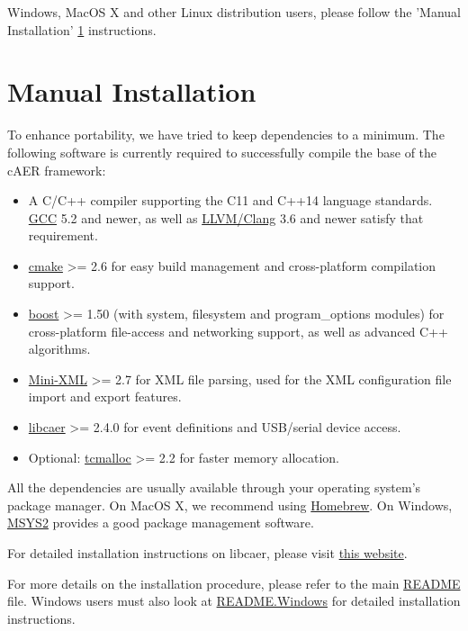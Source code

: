 \documentclass[a4paper,12pt]{report}
\begin{document}
Windows, MacOS X and other Linux distribution users, please follow the 'Manual Installation' \ref{sec:manual_installation} instructions.

\section{Manual Installation} \label{sec:manual_installation}

To enhance portability, we have tried to keep dependencies to a minimum.
The following software is currently required to successfully compile the base of the cAER framework:
\begin{itemize}
\item A C/C++ compiler supporting the C11 and C++14 language standards. \href{https://gcc.gnu.org/}{GCC} 5.2 and newer, as well as \href{https://clang.llvm.org/}{LLVM/Clang} 3.6 and newer satisfy that requirement.
\item \href{https://cmake.org/}{cmake} >= 2.6 for easy build management and cross-platform compilation support.
\item \href{http://www.boost.org/}{boost} >= 1.50 (with system, filesystem and program\_options modules) for cross-platform file-access and networking support, as well as advanced C++ algorithms.
\item \href{https://michaelrsweet.github.io/mxml/}{Mini-XML} >= 2.7 for XML file parsing, used for the XML configuration file import and export features.
\item \href{https://github.com/inilabs/libcaer}{libcaer} >= 2.4.0 for event definitions and USB/serial device access.
\item Optional: \href{https://github.com/gperftools/gperftools}{tcmalloc} >= 2.2 for faster memory allocation.
\end{itemize}

All the dependencies are usually available through your operating system's package manager.
On MacOS X, we recommend using \href{https://brew.sh/}{Homebrew}.
On Windows, \href{http://www.msys2.org/}{MSYS2} provides a good package management software.

For detailed installation instructions on libcaer, please visit \href{https://inilabs.com/support/software/libcaer/}{this website}.

For more details on the installation procedure, please refer to the main \href{https://raw.githubusercontent.com/inilabs/caer/master/README.md}{README} file.
Windows users must also look at \href{https://raw.githubusercontent.com/inilabs/caer/master/README.Windows}{README.Windows} for detailed installation instructions.
\end{document}
